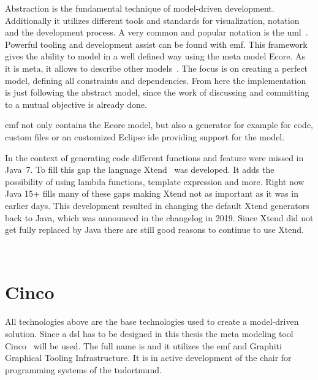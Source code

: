 Abstraction is the fundamental technique of model-driven development. Additionally it utilizes different tools and standards for visualization, notation and the development process. A very common and popular notation is the \gls{uml}~\cite{Cook2017}. Powerful tooling and development assist can be found with \gls{emf}. This framework gives the ability to model in a well defined way using the meta model Ecore. As it is meta, it allows to describe other models~\cite[section 2.3.1]{steinberg2008emf}. The focus is on creating a perfect model, defining all constraints and dependencies. From here the implementation is just following the abstract model, since the work of discussing and committing to a mutual objective is already done.

\gls{emf} not only contains the Ecore model, but also a generator for example for code, custom files or an customized Eclipse \gls{ide} providing support for the model.

In the context of generating code different functions and feature were missed in Java~7. To fill this gap the language Xtend~\cite{xtendhp} was developed. It adds the possibility of using lambda functions,  template expression and more. Right now Java 15+ fills many of these gaps making Xtend not as important as it was in earlier days. This development resulted in changing the default Xtend generators back to Java, which was announced in the changelog in 2019. Since Xtend did not get fully replaced by Java there are still good reasons to continue to use Xtend. 

~\cite{xtendToJava}


\section{Cinco}

All technologies above are the base technologies used to create a model-driven solution. Since a \gls{dsl} has to be designed in this thesis the meta modeling tool Cinco~\cite{CincoHomepage} will be used. The full name is  and it utilizes the \gls{emf} and Graphiti Graphical Tooling Infrastructure. It is in active development of the chair for programming systems of the \gls{tudortmund}.


